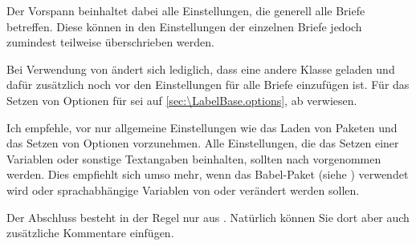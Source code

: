 Der Vorspann beinhaltet dabei alle Einstellungen, die generell alle Briefe
betreffen. Diese können in den Einstellungen der einzelnen Briefe jedoch
zumindest teilweise überschrieben werden.

Bei Verwendung von  ändert sich
lediglich, dass eine andere Klasse geladen und dafür zusätzlich
 noch vor den
Einstellungen für alle Briefe einzufügen ist. Für das Setzen von Optionen für
 sei auf \autoref{sec:\LabelBase.options}, ab
 verwiesen.

Ich empfehle, vor  nur allgemeine
Einstellungen wie das Laden von Paketen und das Setzen von Optionen
vorzunehmen. Alle Einstellungen, die das Setzen einer Variablen oder sonstige
Textangaben beinhalten, sollten nach 
vorgenommen werden. Dies empfiehlt sich umso mehr, wenn das
Babel-Paket (siehe \cite{package:babel}) verwendet wird
oder sprachabhängige Variablen von  oder 
verändert werden sollen.

Der Abschluss besteht in der Regel nur aus
. Natürlich können Sie dort aber auch
zusätzliche Kommentare einfügen.

